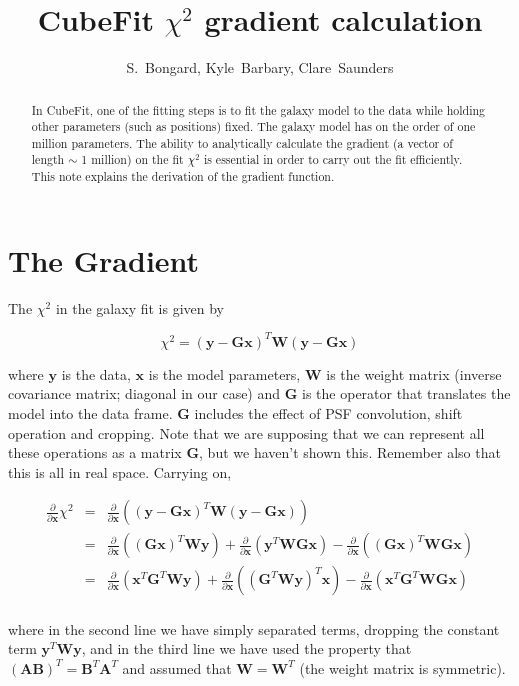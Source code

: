 \documentclass[12pt]{article}
\newcommand{\G}{\mathbf{G}}
\newcommand{\x}{\mathbf{x}}
\newcommand{\y}{\mathbf{y}}
\newcommand{\W}{\mathbf{W}}
\newcommand{\ddx}{\frac{\partial}{\partial \mathbf{x}}}
\begin{document}
\title{CubeFit $\chi^2$ gradient calculation}
\author{S.~Bongard, Kyle~Barbary, Clare~Saunders}
\maketitle
\begin{abstract}
In CubeFit, one of the fitting steps is to fit the galaxy model to the
data while holding other parameters (such as positions) fixed. The
galaxy model has on the order of one million parameters. The ability to
analytically calculate the gradient (a vector of length $\sim$ 1
million) on the fit $\chi^2$ is essential in order to carry out the fit
efficiently. This note explains the derivation of the gradient function.
\end{abstract}


\section{The Gradient}

The $\chi^2$ in the galaxy fit is given by

\begin{equation}
\chi^2 = (\y - \G\x)^T \W (\y - \G\x)
\end{equation}

\noindent where $\y$ is the data, $\x$ is the model parameters, $\W$ is the
weight matrix (inverse covariance matrix; diagonal in our case) and $\G$ is
the operator that translates the model into the data frame. $\G$ includes
the effect of PSF convolution, shift operation and cropping. Note that we
are supposing that we can represent all these operations as a matrix $\G$,
but we haven't shown this. Remember also that this is all in real space.
Carrying on,

\begin{eqnarray*}
  \label{eq:5}
  \ddx \chi^{2} & = & \ddx \left( (\y - \G\x)^{T} \W (\y - \G\x) \right)\\
                & = & \ddx \left( (\G \x)^{T} \W \y \right)
                    + \ddx \left( \y^{T} \W \G \x \right)
                    - \ddx \left( (\G \x)^{T} \W \G \x \right) \\
                & = & \ddx \left( \x^{T} \G^{T} \W \y \right)
                    + \ddx \left( (\G^{T} \W \y)^{T} \x \right)
                    - \ddx \left( \x^{T} \G^{T} \W \G \x \right) \\
\end{eqnarray*}

\noindent where in the second line we have simply separated terms, dropping the
constant term $\y^T \W \y$, and in the third line we have used the property
that $(\mathbf{A}\mathbf{B})^T = \mathbf{B}^T\mathbf{A}^T$ and assumed that
$\W = \W^T$ (the weight matrix is symmetric).
\end{document}
